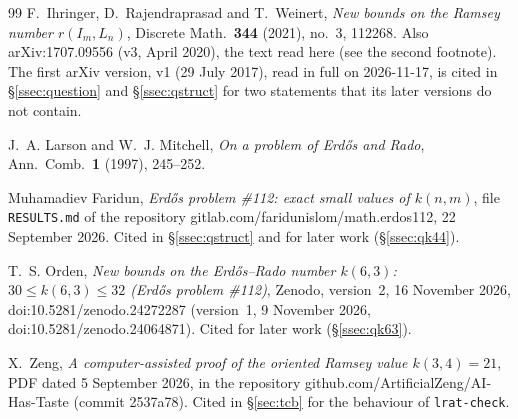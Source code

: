 \documentclass[11pt]{amsart}
\theoremstyle{plain}
\theoremstyle{definition}
\theoremstyle{remark}
\begin{document}
\begin{thebibliography}{99}
F.~Ihringer, D.~Rajendraprasad and T.~Weinert,
\emph{New bounds on the Ramsey number $r(I_m,L_n)$},
Discrete Math.\ \textbf{344} (2021), no.~3, 112268. Also arXiv:1707.09556 (v3,
April 2020), the text read here (see the second footnote). The first
arXiv version, v1 (29 July 2017), read in full on 2026-11-17, is cited in
\S\ref{ssec:question} and \S\ref{ssec:qstruct} for two statements that
its later versions do not contain.

J.~A. Larson and W.~J. Mitchell,
\emph{On a problem of Erd\H{o}s and Rado},
Ann.\ Comb.\ \textbf{1} (1997), 245--252.

Muhamadiev Faridun,
\emph{Erd\H{o}s problem \#112: exact small values of $k(n,m)$}, file
\texttt{RESULTS.md} of the repository gitlab.com/faridunislom/math.erdos112,
22 September 2026. Cited in \S\ref{ssec:qstruct} and for later work
(\S\ref{ssec:qk44}).

T.~S. Orden,
\emph{New bounds on the Erd\H{o}s--Rado number $k(6,3)$:
$30\le k(6,3)\le 32$ (Erd\H{o}s problem \#112)}, Zenodo, version~2,
16 November 2026, doi:10.5281/zenodo.24272287 (version~1, 9 November
2026, doi:10.5281/zenodo.24064871). Cited for later work
(\S\ref{ssec:qk63}).

X.~Zeng,
\emph{A computer-assisted proof of the oriented Ramsey value $k(3,4)=21$},
PDF dated 5 September 2026, in the repository
github.com/ArtificialZeng/AI-Has-Taste (commit 2537a78). Cited in
\S\ref{sec:tcb} for the behaviour of \texttt{lrat-check}.

\end{thebibliography}
\end{document}

